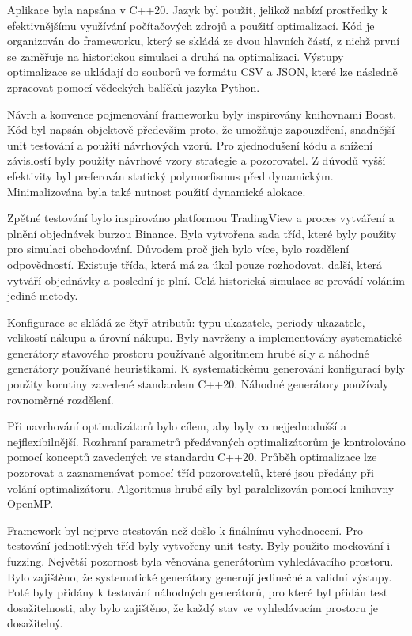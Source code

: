 Aplikace byla napsána v C++20.
Jazyk byl použit, jelikož nabízí prostředky k efektivnějšímu využívání počítačových zdrojů a použití optimalizací.
Kód je organizován do frameworku, který se skládá ze dvou hlavních částí, z nichž první se zaměřuje na historickou simulaci a druhá na optimalizaci.
Výstupy optimalizace se ukládají do souborů ve formátu CSV a JSON, které lze následně zpracovat pomocí vědeckých balíčků jazyka Python.

Návrh a konvence pojmenování frameworku byly inspirovány knihovnami Boost.
Kód byl napsán objektově především proto, že umožňuje zapouzdření, snadnější unit testování a použití návrhových vzorů.
Pro zjednodušení kódu a snížení závislostí byly použity návrhové vzory strategie a pozorovatel.
Z důvodů vyšší efektivity byl preferován statický polymorfismus před dynamickým.
Minimalizována byla také nutnost použití dynamické alokace.

Zpětné testování bylo inspirováno platformou TradingView a proces vytváření a plnění objednávek burzou Binance.
Byla vytvořena sada tříd, které byly použity pro simulaci obchodování.
Důvodem proč jich bylo více, bylo rozdělení odpovědností.
Existuje třída, která má za úkol pouze rozhodovat, další, která vytváří objednávky a poslední je plní.
Celá historická simulace se provádí voláním jediné metody.

Konfigurace se skládá ze čtyř atributů: typu ukazatele, periody ukazatele, velikostí nákupu a úrovní nákupu.
Byly navrženy a implementovány systematické generátory stavového prostoru používané algoritmem hrubé síly a náhodné generátory používané heuristikami.
K systematickému generování konfigurací byly použity korutiny zavedené standardem C++20.
Náhodné generátory používaly rovnoměrné rozdělení.

Při navrhování optimalizátorů bylo cílem, aby byly co nejjednodušší a nejflexibilnější.
Rozhraní parametrů předávaných optimalizátorům je kontrolováno pomocí konceptů zavedených ve standardu C++20.
Průběh optimalizace lze pozorovat a zaznamenávat pomocí tříd pozorovatelů, které jsou předány při volání optimalizátoru.
Algoritmus hrubé síly byl paralelizován pomocí knihovny OpenMP.

Framework byl nejprve otestován než došlo k finálnímu vyhodnocení.
Pro testování jednotlivých tříd byly vytvořeny unit testy.
Byly použito mockování i fuzzing.
Největší pozornost byla věnována generátorům vyhledávacího prostoru.
Bylo zajištěno, že systematické generátory generují jedinečné a validní výstupy.
Poté byly přidány k testování náhodných generátorů, pro které byl přidán test dosažitelnosti, aby bylo zajištěno, že každý stav ve vyhledávacím prostoru je dosažitelný.

